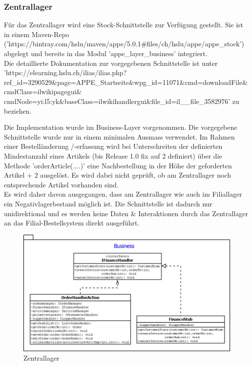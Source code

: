 \subsubsection{Zentrallager}
Für das Zentrallager wird eine Stock-Schnittstelle zur Verfügung gestellt. Sie ist in einem Maven-Repo ('https://bintray.com/hslu/maven/appe/5.0.1\#files/ch/hslu/appe/appe\_stock') abgelegt und bereits in das Modul 'appe\_layer\_business' integriert.\\
Die detaillierte Dokumentation zur vorgegebenen Schnittstelle ist unter\\
'https://elearning.hslu.ch/ilias/ilias.php?ref\_id=3290529\&page=APPE\_Startseite\&wpg\_id=11071\&cmd=downloadFile\&cmdClass=ilwikipagegui\& cmdNode=yi:l5:yk\&baseClass=ilwikihandlergui\&file\_id=il\_\_file\_3582976' zu beziehen.

Die Implementation wurde im Business-Layer vorgenommen. Die vorgegebene Schnittstelle wurde nur in einem minimalen Ausmass verwendet. Im Rahmen einer Bestelländerung /-erfassung wird bei Unterschreiten der definierten Mindestanzahl eines Artikels (bis Release 1.0 fix auf 2 definiert) über die Methode 'orderArticle(....)' eine Nachbestellung in der Höhe der geforderten Artikel + 2 ausgelöst. Es wird dabei nicht geprüft, ob am Zentrallager noch entsprechende Artikel vorhanden sind. \\Es wird daher davon ausgegangen, dass am Zentrallager wie auch im Filiallager ein Negativlagerbestand möglich ist. Die Schnittstelle ist dadurch nur unidirektional und es werden keine Daten \& Interaktionen durch das Zentrallager an das Filial-Bestellsystem direkt ausgeführt.  \\
\begin{figure}[H]
\centering
	\includegraphics[width=1.0\linewidth]{Images/Zentrallager}
	\caption{Zentrallager}
	\label{fig:zentrallager}
\end{figure}



